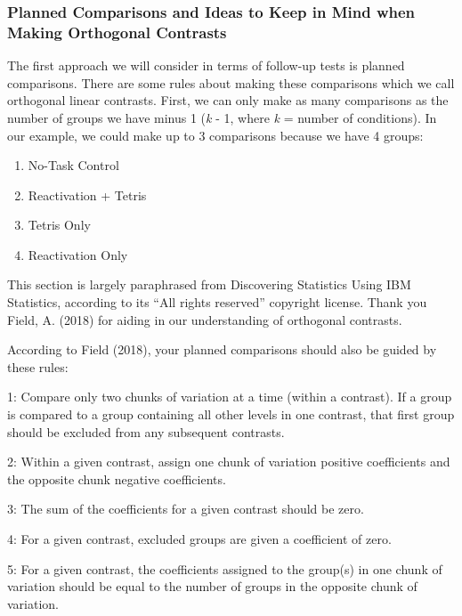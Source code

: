 \documentclass[
]{book}
\providecommand{\tightlist}{%
  \setlength{\itemsep}{0pt}\setlength{\parskip}{0pt}}
\begin{document}
\hypertarget{planned-comparisons-and-ideas-to-keep-in-mind-when-making-orthogonal-contrasts}{%
\subsubsection{Planned Comparisons and Ideas to Keep in Mind when Making Orthogonal Contrasts}\label{planned-comparisons-and-ideas-to-keep-in-mind-when-making-orthogonal-contrasts}}

The first approach we will consider in terms of follow-up tests is planned comparisons. There are some rules about making these comparisons which we call orthogonal linear contrasts. First, we can only make as many comparisons as the number of groups we have minus 1 (\emph{k} - 1, where \emph{k} = number of conditions).
In our example, we could make up to 3 comparisons because we have 4 groups:

\begin{enumerate}
\def\labelenumi{\arabic{enumi}.}
\tightlist
\item
  No-Task Control
\item
  Reactivation + Tetris
\item
  Tetris Only
\item
  Reactivation Only
\end{enumerate}

This section is largely paraphrased from Discovering Statistics Using IBM Statistics, according to its ``All rights reserved'' copyright license. Thank you Field, A. (2018) for aiding in our understanding of orthogonal contrasts.

According to Field (2018), your planned comparisons should also be guided by these rules:

1: Compare only two chunks of variation at a time (within a contrast). If a group is compared to a group containing all other levels in one contrast, that first group should be excluded from any subsequent contrasts.

2: Within a given contrast, assign one chunk of variation positive coefficients and the opposite chunk negative coefficients.

3: The sum of the coefficients for a given contrast should be zero.

4: For a given contrast, excluded groups are given a coefficient of zero.

5: For a given contrast, the coefficients assigned to the group(s) in one chunk of variation should be equal to the number of groups in the opposite chunk of variation.
\end{document}
